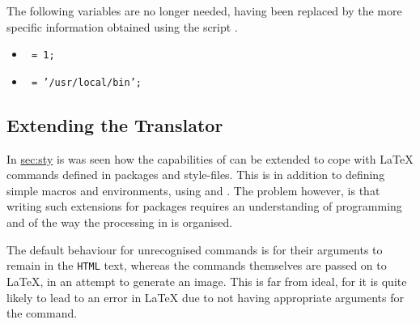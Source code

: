 \noindent
The following variables are no longer needed, having been replaced by the
more specific information obtained using the \Perl{} script .
\begin{itemize}
\item [] \texttt{ = 1;}
\item [] \texttt{ = '/usr/local/bin';}
\end{itemize}


\subsection{Extending the Translator\label{sec:ext}}%
\tableofchildlinks*\htmlrule
%
In \hyperref{an earlier section}{Section~}{}{sec:sty} is was seen how
the capabilities of \latextohtml{} can be extended to cope with
\LaTeX{} commands defined in packages and style-files.
This is in addition to defining simple macros and environments,
using  and .
The problem however, is that writing such extensions for packages 
requires an understanding of \Perl{} programming 
and of the way the processing in \latextohtml{} is organised. 

%
%
\smallskip

The default behaviour for unrecognised commands is 
for their arguments to remain in the \texttt{HTML} text,
whereas the commands themselves are passed on to \LaTeX,
in an attempt to generate an image. This is far from ideal,
for it is quite likely to lead to an error in \LaTeX{}
due to not having appropriate arguments for the command.

